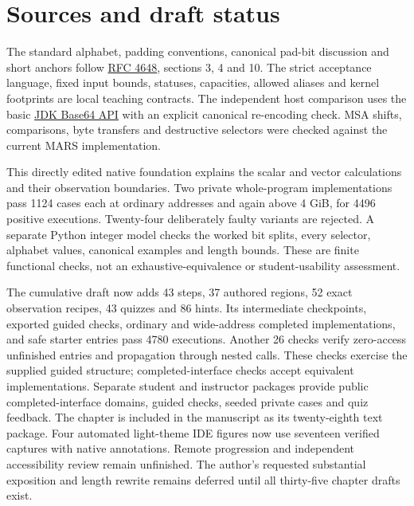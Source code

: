 \section{Sources and draft status}
The standard alphabet, padding conventions, canonical pad-bit discussion and short
anchors follow \href{https://www.rfc-editor.org/rfc/rfc4648.html}{RFC 4648}, sections
3, 4 and 10. The strict acceptance language, fixed input bounds, statuses, capacities,
allowed aliases and kernel footprints are local teaching contracts. The independent
host comparison uses the basic \href{https://docs.oracle.com/en/java/javase/25/docs/api/java.base/java/util/Base64.html}{JDK Base64 API}
with an explicit canonical re-encoding check. MSA shifts, comparisons, byte transfers
and destructive selectors were checked against the current MARS implementation.

This directly edited native foundation explains the scalar and vector calculations and
their observation boundaries. Two private whole-program implementations pass 1124 cases
each at ordinary addresses and again above 4 GiB, for 4496 positive executions.
Twenty-four deliberately faulty variants are rejected. A separate Python integer model
checks the worked bit splits, every selector, alphabet values, canonical examples and
length bounds. These are finite functional checks, not an exhaustive-equivalence or
student-usability assessment.

The cumulative draft now adds 43 steps, 37 authored regions, 52 exact observation
recipes, 43 quizzes and 86 hints. Its intermediate checkpoints, exported guided checks,
ordinary and wide-address completed implementations, and safe starter entries pass
4780 executions. Another
26 checks verify zero-access unfinished entries and propagation through nested calls.
These checks exercise the supplied guided structure; completed-interface checks accept
equivalent implementations. Separate student and instructor packages provide public
completed-interface domains, guided checks, seeded private cases and quiz feedback.
The chapter is included in the manuscript as its twenty-eighth text package. Four
automated light-theme IDE figures now use seventeen verified captures with native
annotations. Remote progression and independent accessibility review remain unfinished. The author's requested substantial exposition and length
rewrite remains deferred until all thirty-five chapter drafts exist.
